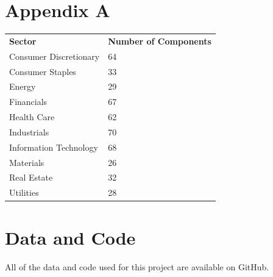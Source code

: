 \documentclass{article}
\begin{document}

\section*{Appendix A}
\begin{center}
    \begin{table}[ht]
\begin{tabular}{ll}
\textbf{Sector}        & \textbf{Number of Components} \\
Consumer Discretionary & 64                            \\
Consumer Staples       & 33                            \\
Energy                 & 29                            \\
Financials             & 67                            \\
Health Care            & 62                            \\
Industrials            & 70                            \\
Information Technology & 68                            \\
Materials              & 26                            \\
Real Estate            & 32                            \\
Utilities              & 28                           
\end{tabular}
\end{table}
\end{center}
\section{Data and Code}
All of the data and code used for this project are available on GitHub. 

\newpage
\end{document}
